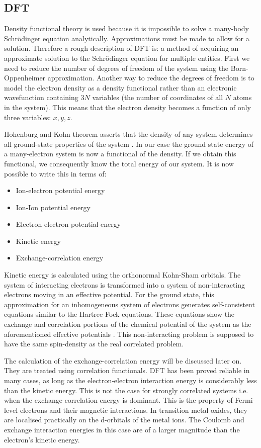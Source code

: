 \documentclass[10pt]{article}
\begin{document}
\subsection{DFT}
Density functional theory is used because it is impossible to solve a many-body Schrödinger equation analytically. Approximations must be made to allow for a solution. Therefore a rough description of DFT is: a method of acquiring an approximate solution to the Schrödinger equation for multiple entities. First we need to reduce the number of degrees of freedom of the system using the Born-Oppenheimer approximation. Another way to reduce the degrees of freedom is to model the electron density as a density functional rather than an electronic wavefunction containing $3N$ variables (the number of coordinates of all $N$ atoms in the system). This means that the electron density becomes a function of only three variables: $x,y,z$.

Hohenburg and Kohn theorem asserts that the density of any system determines all ground-state properties of the system \cite{hohenberg1964density}. In our case the ground state energy of a many-electron system is now a functional of the density. If we obtain this functional, we consequently know the total energy of our system. It is now possible to write this in terms of:

\begin{itemize}
	\item Ion-electron potential energy
	\item Ion-Ion potential energy
	\item Electron-electron potential energy
	\item Kinetic energy
	\item Exchange-correlation energy
\end{itemize}

Kinetic energy is calculated using the orthonormal Kohn-Sham orbitals. The system of interacting electrons is transformed into a system of non-interacting electrons moving in an effective potential. For the ground state, this approximation for an inhomogeneous system of electrons generates self-consistent equations similar to the Hartree-Fock equations. These equations show the exchange and correlation portions of the chemical potential of the system as the aforementioned effective potentials \cite{kohn1965self}. This non-interacting problem is supposed to have the same spin-density as the real correlated problem.

The calculation of the exchange-correlation energy will be discussed later on. They are treated using correlation functionals. DFT has been proved reliable in many cases, as long as the electron-electron interaction energy is considerably less than the kinetic energy. This is not the case for strongly correlated systems i.e. when the exchange-correlation energy is dominant\cite{pickett1989electronic}. This is the property of Fermi-level electrons and their magnetic interactions. In transition metal oxides, they are localised practically on the d-orbitals of the metal ions. The Coulomb and exchange interaction energies in this case are of a larger magnitude than the electron's kinetic energy.
\end{document}

